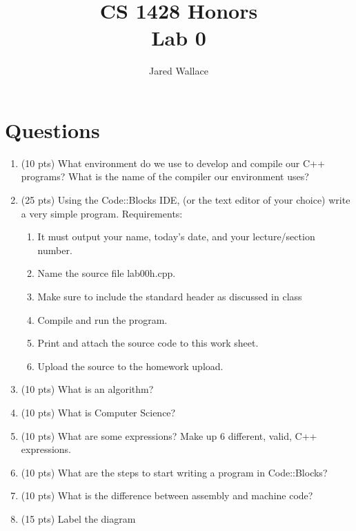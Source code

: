 \documentclass[letterpaper,12pt]{article}
\title{\Large CS 1428 Honors\\Lab 0}
\author{Jared Wallace}
\date{}
\begin{document}
\maketitle

\vspace{30mm}

\section*{Questions}
\begin{enumerate}
    \item (10 pts) What environment do we use to develop and compile our C++ programs? What is the name of the compiler our environment uses?
    \vspace*{40mm}
    \item (25 pts) Using the Code::Blocks IDE, (or the text editor of your choice) write a very
                   simple program. Requirements:
                   \begin{enumerate}
                        \item It must output your name, today’s date, and your lecture/section number.
                        \item Name the source file lab00h.cpp.
                        \item Make sure to include the standard header as discussed in class
                        \item Compile and run the program.
                        \item Print and attach the source code to this work sheet.
                        \item Upload the source to the homework upload.
                    \end{enumerate}
    \item (10 pts) What is an algorithm?
    \vspace*{40mm}
    \item (10 pts) What is Computer Science?
    \vspace*{40mm}
    \item (10 pts) What are some expressions? Make up 6 different, valid, C++ expressions.
    \vspace*{40mm}
    \item (10 pts) What are the steps to start writing a program in Code::Blocks? 
    \vspace*{40mm}
    \item (10 pts) What is the difference between assembly and machine code?
    \vspace*{40mm}
    \item (15 pts) Label the diagram
\end{enumerate}
\end{document}
